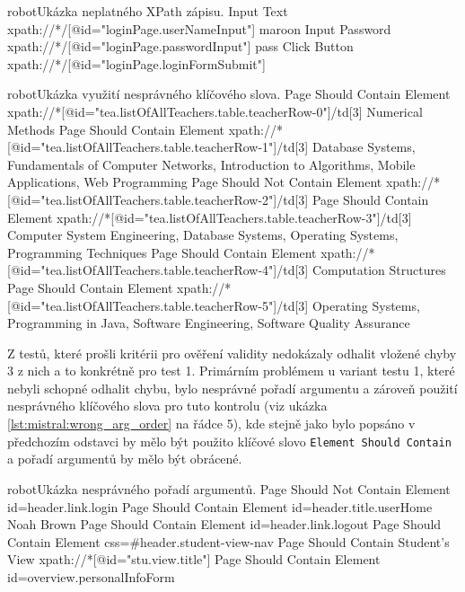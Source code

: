 \documentclass[czech, ma, kiv, he, iso690alph, pdf, viewonly]{fasthesis}
\begin{document}
        \begin{code}{robot}{Ukázka neplatného XPath zápisu. \label{lst:mistral:wrong_xpath}}
Input Text    xpath://*/[@id="loginPage.userNameInput"]    maroon
Input Password    xpath://*/[@id="loginPage.passwordInput"]    pass
Click Button    xpath://*/[@id="loginPage.loginFormSubmit"]
        \end{code}

        \begin{code}{robot}{Ukázka využití nesprávného klíčového slova. \label{lst:mistral:incorrect_keyword}}
Page Should Contain Element    xpath://*[@id="tea.listOfAllTeachers.table.teacherRow-0"]/td[3]    Numerical Methods
Page Should Contain Element    xpath://*[@id="tea.listOfAllTeachers.table.teacherRow-1"]/td[3]    Database Systems, Fundamentals of Computer Networks, Introduction to Algorithms, Mobile Applications, Web Programming
Page Should Not Contain Element    xpath://*[@id="tea.listOfAllTeachers.table.teacherRow-2"]/td[3]
Page Should Contain Element    xpath://*[@id="tea.listOfAllTeachers.table.teacherRow-3"]/td[3]    Computer System Engineering, Database Systems, Operating Systems, Programming Techniques
Page Should Contain Element    xpath://*[@id="tea.listOfAllTeachers.table.teacherRow-4"]/td[3]    Computation Structures
Page Should Contain Element    xpath://*[@id="tea.listOfAllTeachers.table.teacherRow-5"]/td[3]    Operating Systems, Programming in Java, Software Engineering, Software Quality Assurance
        \end{code}

        \noindent Z testů, které prošli kritérii pro ověření validity nedokázaly odhalit vložené chyby 3 z nich a to konkrétně pro test 1. Primárním problémem u variant testu 1, které nebyli schopné odhalit chybu, bylo nesprávné pořadí argumentu a zároveň použití nesprávného klíčového slova pro tuto kontrolu (viz ukázka \ref{lst:mistral:wrong_arg_order} na řádce 5), kde stejně jako bylo popsáno v předchozím odstavci by mělo být použito klíčové slovo \verb|Element Should Contain| a pořadí argumentů by mělo být obrácené.

        \begin{code}{robot}{Ukázka nesprávného pořadí argumentů. \label{lst:mistral:wrong_arg_order}}
Page Should Not Contain Element    id=header.link.login
Page Should Contain Element    id=header.title.userHome    Noah Brown
Page Should Contain Element    id=header.link.logout
Page Should Contain Element    css=#header.student-view-nav
Page Should Contain    Student's View    xpath://*[@id="stu.view.title"]
Page Should Contain Element    id=overview.personalInfoForm
        \end{code}
\end{document}
